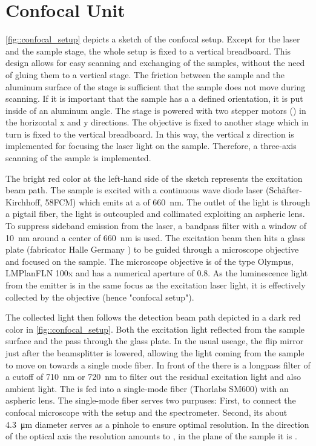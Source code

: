 	\section[Confocal Unit]{Confocal Unit}

		\autoref{fig::confocal_setup} depicts a sketch of the confocal setup. 
		Except for the laser and the sample stage, the whole setup is fixed to a vertical breadboard. 
		This design allows for easy scanning and exchanging of the samples, without the need of gluing them to a vertical stage.
		The friction between the sample and the aluminum surface of the stage is sufficient that the sample does not move during scanning.
		If it is important that the sample has a a defined orientation, it is put inside of an aluminum angle.
		The stage is powered with two stepper motors () in the horizontal x and y directions.
		The objective is fixed to another stage which in turn is fixed to the vertical breadboard.
		In this way, the vertical z direction is implemented for focusing the laser light on the sample.
		Therefore, a three-axis scanning of the sample is implemented.

		The bright red color at the left-hand side of the sketch represents the excitation beam path.
		The sample is excited with a continuous wave diode laser (Sch\"after-Kirchhoff, 58FCM) which emits at a \wl of \SI{660}{\nano\meter}.
		The outlet of the light is through a pigtail fiber, the light is outcoupled and collimated exploiting an aspheric lens.
		To suppress sideband emission from the laser, a bandpass filter with a window of  \SI{10}{\nm} around a center of \SI{660}{\nm} is used.
		The excitation beam then hits a glass plate (fabricator Halle Germany ) to be guided through a microscope objective and focused on the sample.
		The microscope objective is of the type Olympus, LMPlanFLN 100x and has a numerical aperture of 0.8.
		As the luminescence light from the emitter is in the same focus as the excitation laser light, it is effectively collected by the objective (hence "confocal setup").

		The collected light then follows the detection beam path depicted in a dark red color in \autoref{fig::confocal_setup}.
		Both the excitation light reflected from the sample surface and the \fl pass through the glass plate.
		In the usual useage, the flip mirror just after the beamsplitter is lowered, allowing the light coming from the sample to move on towards a single mode fiber. 
		In front of the \smf there is a longpass filter of a cutoff \wl of \SI{710}{\nm} or \SI{720}{\nm} to filter out the residual excitation light and also ambient light.
		The \fl is fed into a single-mode fiber (Thorlabs SM600) with an aspheric lens.
		The single-mode fiber serves two purpuses: First, to connect the confocal microscope with the \hbt setup and the spectrometer.
		Second, its about \SI{4.3}{\micro\meter} diameter serves as a pinhole to ensure optimal resolution. 
		In the direction of the optical axis the resolution amounts to , in the plane of the sample it is .

